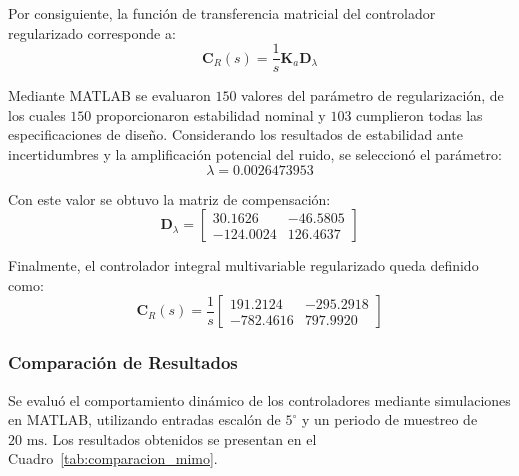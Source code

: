 \documentclass[12pt,a4paper]{article}
\begin{document}
Por consiguiente, la función de transferencia matricial del controlador regularizado corresponde a:
\begin{equation}
\mathbf{C}_R(s) = \frac{1}{s}\mathbf{K}_a\mathbf{D}_\lambda
\end{equation}

Mediante MATLAB se evaluaron $150$ valores del parámetro de regularización, de los cuales $150$ proporcionaron estabilidad nominal y $103$ cumplieron todas las especificaciones de diseño. Considerando los resultados de estabilidad ante incertidumbres y la amplificación potencial del ruido, se seleccionó el parámetro:
\begin{equation}
\boxed{\lambda = 0.0026473953}
\end{equation}

Con este valor se obtuvo la matriz de compensación:
\begin{equation}
\mathbf{D}_\lambda = \begin{bmatrix} 30.1626 & -46.5805 \\ -124.0024 & 126.4637 \end{bmatrix}
\end{equation}

Finalmente, el controlador integral multivariable regularizado queda definido como:
\begin{equation}
\boxed{
\mathbf{C}_R(s) = \frac{1}{s}\begin{bmatrix} 191.2124 & -295.2918 \\ -782.4616 & 797.9920 \end{bmatrix}
}
\end{equation}

\subsubsection{Comparación de Resultados}
Se evaluó el comportamiento dinámico de los controladores mediante simulaciones en MATLAB, utilizando entradas escalón de $5^\circ$ y un periodo de muestreo de $20\text{ ms}$. Los resultados obtenidos se presentan en el Cuadro~\ref{tab:comparacion_mimo}.
\end{document}

